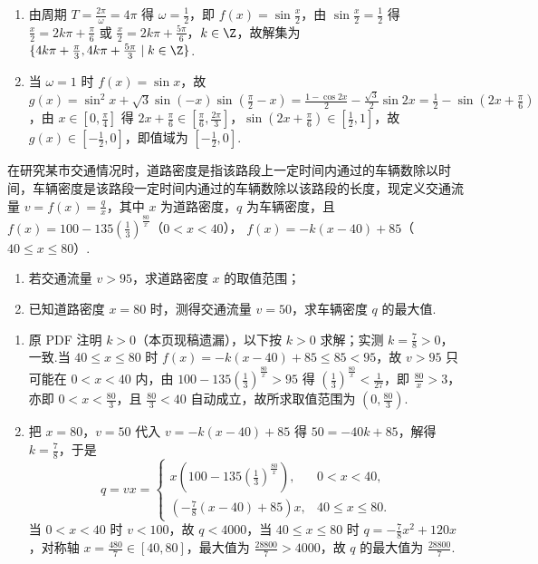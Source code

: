 \begin{solution}
\begin{enumerate}
\item 由周期 \(T=\frac{2\pi}{\omega}=4\pi\) 得 \(\omega=\frac12\)，即 \(f(x)=\sin\frac{x}{2}\)，由 \(\sin\frac{x}{2}=\frac12\) 得 \(\frac{x}{2}=2k\pi+\frac{\pi}{6}\) 或 \(\frac{x}{2}=2k\pi+\frac{5\pi}{6}\)，\(k\in\Z\)，故解集为 \(\{4k\pi+\frac{\pi}{3},4k\pi+\frac{5\pi}{3}\mid k\in\Z\}\).
\item 当 \(\omega=1\) 时 \(f(x)=\sin x\)，故 \(g(x)=\sin^2x+\sqrt3\sin(-x)\sin\left(\frac{\pi}{2}-x\right)=\frac{1-\cos2x}{2}-\frac{\sqrt3}{2}\sin2x=\frac12-\sin\left(2x+\frac{\pi}{6}\right)\)，由 \(x\in\left[0,\frac{\pi}{4}\right]\) 得 \(2x+\frac{\pi}{6}\in\left[\frac{\pi}{6},\frac{2\pi}{3}\right]\)，\(\sin\left(2x+\frac{\pi}{6}\right)\in\left[\frac12,1\right]\)，故 \(g(x)\in\left[-\frac12,0\right]\)，即值域为 \(\left[-\frac12,0\right]\).
\end{enumerate}
\end{solution}

\begin{problem}
在研究某市交通情况时，道路密度是指该路段上一定时间内通过的车辆数除以时间，车辆密度是该路段一定时间内通过的车辆数除以该路段的长度，现定义交通流量 \(v=f(x)=\frac{q}{x}\)，其中 \(x\) 为道路密度，\(q\) 为车辆密度，且
\(f(x)=100-135\left(\frac13\right)^{\frac{80}{x}}\)（\(0<x<40\)），
\(f(x)=-k(x-40)+85\)（\(40\le x\le80\)）.

\begin{enumerate}
\item 若交通流量 \(v>95\)，求道路密度 \(x\) 的取值范围；
\item 已知道路密度 \(x=80\) 时，测得交通流量 \(v=50\)，求车辆密度 \(q\) 的最大值.
\end{enumerate}
\end{problem}

\begin{solution}
\begin{enumerate}
\item 原 PDF 注明 \(k>0\)（本页现稿遗漏），以下按 \(k>0\) 求解；实测 \(k=\frac78>0\)，一致.当 \(40\le x\le80\) 时 \(f(x)=-k(x-40)+85\le85<95\)，故 \(v>95\) 只可能在 \(0<x<40\) 内，由 \(100-135\left(\frac13\right)^{\frac{80}{x}}>95\) 得 \(\left(\frac13\right)^{\frac{80}{x}}<\frac1{27}\)，即 \(\frac{80}{x}>3\)，亦即 \(0<x<\frac{80}{3}\)，且 \(\frac{80}{3}<40\) 自动成立，故所求取值范围为 \(\left(0,\frac{80}{3}\right)\).
\item 把 \(x=80\)，\(v=50\) 代入 \(v=-k(x-40)+85\) 得 \(50=-40k+85\)，解得 \(k=\frac78\)，于是
\[q=vx=
\begin{cases}
x\left(100-135\left(\frac13\right)^{\frac{80}{x}}\right), & 0<x<40,\\
\left(-\frac78(x-40)+85\right)x, & 40\le x\le80.
\end{cases}\]
当 \(0<x<40\) 时 \(v<100\)，故 \(q<4000\)，当 \(40\le x\le80\) 时 \(q=-\frac78x^2+120x\)，对称轴 \(x=\frac{480}{7}\in[40,80]\)，最大值为 \(\frac{28800}{7}>4000\)，故 \(q\) 的最大值为 \(\frac{28800}{7}\).
\end{enumerate}
\end{solution}

